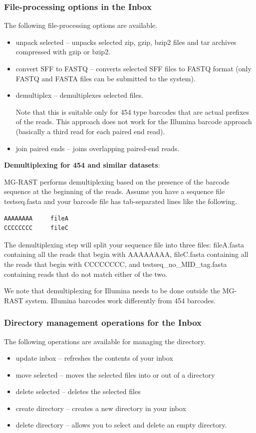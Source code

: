 \documentclass[12pt,fullpage]{report}
\begin{document}
\subsubsection{File-processing options in the Inbox}
The following file-processing options are available. 
\begin{itemize}
\item unpack selected --
unpacks selected zip, gzip, bzip2 files and tar archives compressed with gzip or bzip2.
\item convert SFF to FASTQ --
converts selected SFF files to FASTQ format (only FASTQ and FASTA files can be submitted to the system).
\item demultiplex --
demultiplexes selected files.

Note that this is suitable only for 454 type barcodes that are actual prefixes of the reads. This approach does not work for the Illumina barcode approach (basically a third read for each paired end read).

\item join paired ends --
joins overlapping paired-end reads.
\end{itemize}

\noindent
{\bf Demultiplexing for 454 and similar datasets}:

MG-RAST performs demultiplexing based on the presence of the barcode sequence at the beginning of the reads.
Assume you have a sequence file testseq.fasta and your barcode file has tab-separated lines like the following.
\begin{verbatim}
AAAAAAAA     fileA
CCCCCCCC     fileC
\end{verbatim}
The demultiplexing step will split your sequence file into three files:
fileA.fasta containing all the reads that begin with AAAAAAAA,
fileC.fasta containing all the reads that begin with CCCCCCCC,
and
testseq\_no\_MID\_tag.fasta containing reads that do not match either of the two.

We note that demultiplexing for Illumina needs to be done outside the MG-RAST system. Illumina barcodes work differently from 454 barcodes.
\subsubsection{Directory management operations for the Inbox}
The following operations are available for managing the directory.

\begin{itemize}
\item update inbox --
refreshes the contents of your inbox
\item move selected --
 moves the selected files into or out of a directory
\item delete selected --
deletes the selected files
\item create directory --
creates a new directory in your inbox
\item delete directory --
allows you to select and delete an empty directory.
\end{itemize}
\end{document}
